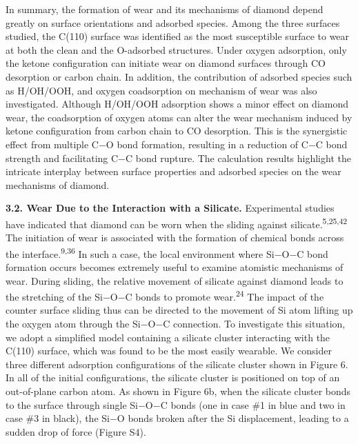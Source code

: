 \documentclass{article}
\begin{document}
In summary, the formation of wear and its mechanisms of diamond depend greatly on surface orientations and adsorbed species. Among the three surfaces studied, the C(110) surface was identified as the most susceptible surface to wear at both the clean and the O-adsorbed structures. Under oxygen adsorption, only the ketone configuration can initiate wear on diamond surfaces through CO desorption or carbon chain. In addition, the contribution of adsorbed species such as H/OH/OOH, and oxygen coadsorption on mechanism of wear was also investigated. Although H/OH/OOH adsorption shows a minor effect on diamond wear, the coadsorption of oxygen atoms can alter the wear mechanism induced by ketone configuration from carbon chain to CO desorption. This is the synergistic effect from multiple C−O bond formation, resulting in a reduction of C−C bond strength and facilitating C−C bond rupture. The calculation results highlight the intricate interplay between surface properties and adsorbed species on the wear mechanisms of diamond.

\noindent\textbf{3.2. Wear Due to the Interaction with a Silicate.} Experimental studies have indicated that diamond can be worn when the sliding against silicate.\textsuperscript{5,25,42} The initiation of wear is associated with the formation of chemical bonds across the interface.\textsuperscript{9,36} In such a case, the local environment where Si−O−C bond formation occurs becomes extremely useful to examine atomistic mechanisms of wear. During sliding, the relative movement of silicate against diamond leads to the stretching of the Si−O−C bonds to promote wear.\textsuperscript{24} The impact of the counter surface sliding thus can be directed to the movement of Si atom lifting up the oxygen atom through the Si−O−C connection. To investigate this situation, we adopt a simplified model containing a silicate cluster interacting with the C(110) surface, which was found to be the most easily wearable. We consider three different adsorption configurations of the silicate cluster shown in Figure 6. In all of the initial configurations, the silicate cluster is positioned on top of an out-of-plane carbon atom. As shown in Figure 6b, when the silicate cluster bonds to the surface through single Si−O−C bonds (one in case \#1 in blue and two in case \#3 in black), the Si−O bonds broken after the Si displacement, leading to a sudden drop of force (Figure S4).
\end{document}

